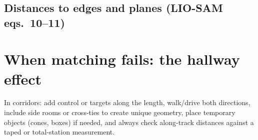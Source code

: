 \subsection{Distances to edges and planes (LIO-SAM eqs.\ 10--11)}


\section{When matching fails: the hallway effect}


\begin{tip}
In corridors: add control or targets along the length, walk/drive both directions, include side rooms or cross-ties to create unique geometry, place temporary objects (cones, boxes) if needed, and always check along-track distances against a taped or total-station measurement.
\end{tip}
